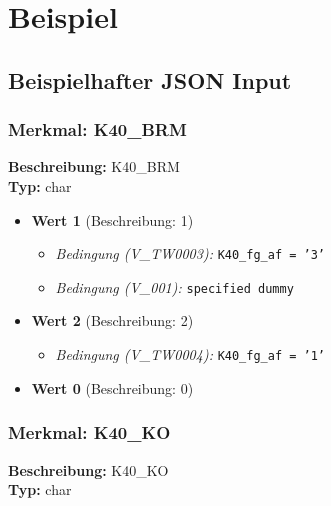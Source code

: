 \documentclass[12pt, a4paper, oneside]{book}
\begin{document}
\chapter{Beispiel}
\label{beispiel}
\section{Beispielhafter JSON Input}
\subsection*{Merkmal: K40\_BRM}
\textbf{Beschreibung:} K40\_BRM \\
\textbf{Typ:} char

\begin{itemize}
    \item \textbf{Wert 1} (Beschreibung: 1)
    \begin{itemize}
        \item \textit{Bedingung (V\_TW0003):} \texttt{K40\_fg\_af = '3'}
        \item \textit{Bedingung (V\_001):} \texttt{specified dummy}
    \end{itemize}
    \item \textbf{Wert 2} (Beschreibung: 2)
    \begin{itemize}
        \item \textit{Bedingung (V\_TW0004):} \texttt{K40\_fg\_af = '1'}
    \end{itemize}
    \item \textbf{Wert 0} (Beschreibung: 0)
\end{itemize}

\subsection*{Merkmal: K40\_KO}
\textbf{Beschreibung:} K40\_KO \\
\textbf{Typ:} char
\end{document}
